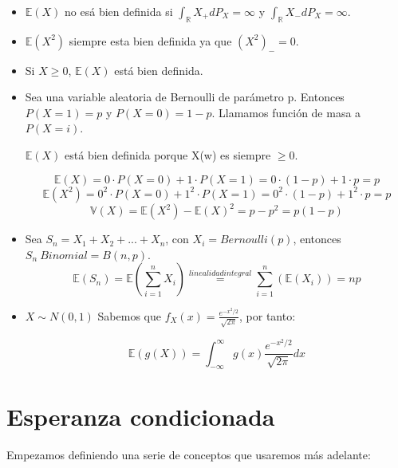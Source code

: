 \documentclass{apuntes}
\begin{document}
\begin{example}
\begin{itemize}
\item $\mathbb{E}(X)$ no esá bien definida si $\int_{\mathbb{R}}X_+ dP_X=\infty$ y $\int_{\mathbb{R}}X_- dP_X=\infty$.

\item $\mathbb{E}(X^2)$ siempre esta bien definida ya que $(X^2)_-=0$.
\item Si $X \geq 0$, $\mathbb{E}(X)$ está bien definida.
\item Sea una variable aleatoria de Bernoulli de parámetro p. Entonces $P(X=1)=p$ y $P(X=0)=1-p$. Llamamos función de masa a $P(X=i)$.

$\mathbb{E}(X)$ está bien definida porque X(w) es siempre $\geq 0$. 

\[
\mathbb{E}(X)=0\cdot P(X=0)+1\cdot P(X=1)=0\cdot(1-p)+1\cdot p=p
\]
\[
\mathbb{E}(X^2)=0^2\cdot P(X=0)+1^2\cdot P(X=1)=0^2\cdot(1-p)+1^2\cdot p=p
\]
\[
\mathbb{V}(X)=\mathbb{E}(X^2)-\mathbb{E}(X)^2=p-p^2=p(1-p)
\]
\item Sea $S_n=X_1+X_2+...+X_n$, con $X_i=Bernoulli(p)$, entonces $S_n ~ Binomial=B(n,p)$.
\[
\mathbb{E}(S_n)=\mathbb{E}(\sum_{i=1}^{n}X_i)\stackrel{linealidad integral}{=}\sum_{i=1}^{n}(\mathbb{E}(X_i))=np
\]
\item $X\sim N(0,1)$
Sabemos que $f_X(x)=\frac{e^{-x^2/2}}{\sqrt{2\pi}}$, por tanto:

\[
\mathbb{E}(g(X))=\int_{-\infty}^{\infty}g(x)\frac{e^{-x^2/2}}{\sqrt{2\pi}}dx
\]
\end{itemize}
\end{example}

\chapter{Esperanza condicionada}

Empezamos definiendo una serie de conceptos que usaremos más adelante:
\end{document}
